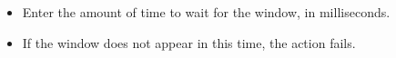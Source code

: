 \begin{itemize}
\item Enter the amount of time to wait for the window, in milliseconds.
\item If the window does not appear in this time, the action fails.
\end{itemize}

